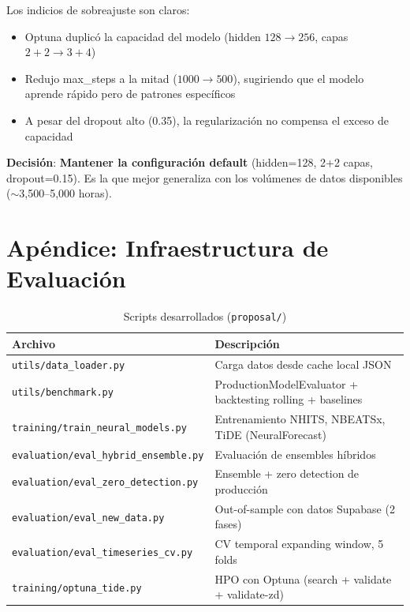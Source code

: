 \documentclass[11pt,a4paper]{article}
\begin{document}
Los indicios de sobreajuste son claros:
\begin{itemize}
    \item Optuna duplic\'o la capacidad del modelo (hidden $128 \to 256$, capas $2+2 \to 3+4$)
    \item Redujo max\_steps a la mitad ($1000 \to 500$), sugiriendo que el modelo aprende r\'apido pero de patrones espec\'ificos
    \item A pesar del dropout alto (0.35), la regularizaci\'on no compensa el exceso de capacidad
\end{itemize}

\textbf{Decisi\'on}: \textbf{Mantener la configuraci\'on default} (hidden=128, 2+2 capas, dropout=0.15). Es la que mejor generaliza con los vol\'umenes de datos disponibles ($\sim$3,500--5,000 horas).

\section*{Ap\'endice: Infraestructura de Evaluaci\'on}

\begin{table}[H]
\centering
\small
\caption{Scripts desarrollados (\texttt{proposal/})}
\begin{tabular}{lp{9cm}}
\toprule
\textbf{Archivo} & \textbf{Descripci\'on} \\
\midrule
\texttt{utils/data\_loader.py} & Carga datos desde cache local JSON \\
\texttt{utils/benchmark.py} & ProductionModelEvaluator + backtesting rolling + baselines \\
\texttt{training/train\_neural\_models.py} & Entrenamiento NHITS, NBEATSx, TiDE (NeuralForecast) \\
\texttt{evaluation/eval\_hybrid\_ensemble.py} & Evaluaci\'on de ensembles h\'ibridos \\
\texttt{evaluation/eval\_zero\_detection.py} & Ensemble + zero detection de producci\'on \\
\texttt{evaluation/eval\_new\_data.py} & Out-of-sample con datos Supabase (2 fases) \\
\texttt{evaluation/eval\_timeseries\_cv.py} & CV temporal expanding window, 5 folds \\
\texttt{training/optuna\_tide.py} & HPO con Optuna (search + validate + validate-zd) \\
\bottomrule
\end{tabular}
\end{table}
\end{document}

